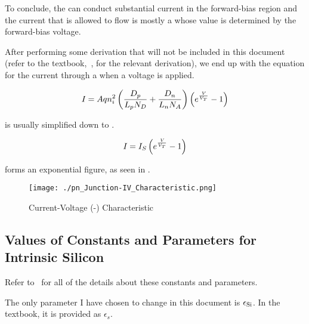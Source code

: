 \begin{blackbox}
  To conclude, the \PNJunction{} can conduct substantial current in the forward-bias region and the current that is allowed to flow is mostly a  whose value is determined by the forward-bias voltage.
\end{blackbox}

After performing some derivation that will not be included in this document (refer to the textbook,~\cite{sedraTextbook7}, for the relevant derivation), we end up with the equation for the current through a \PNJunction{} when a voltage is applied.

\begin{equation}\label{eq:pn-Junction-Current-Voltage_Relation}
  I_{} = A q n_{i}^{2} \left( \frac{D_{p}}{L_{p} N_{D}} + \frac{D_{n}}{L_{n} N_{A}} \right) \left( e^{\frac{V_{}}{V_{T}}} - 1 \right)
\end{equation}

 is usually simplified down to .

\begin{equation}\label{eq:pn-Junction-Current-Voltage_Relation-Simple}
  I_{} = I_{S} \left( e^{\frac{V_{}}{V_{T}}} - 1 \right)
\end{equation}

 forms an exponential figure, as seen in .

\begin{figure}[h!tbp]
  \centering
  \texttt{[image: ./pn\_Junction-IV\_Characteristic.png]}
  \caption{\PNJunction{} Current-Voltage (\DCCurrent{}-\DCVoltage{}) Characteristic \parencite[p.~160]{sedraTextbook7}}
  \label{fig:pn-Junction-Current-Voltage_Relation}
\end{figure}

\subsection{Values of Constants and Parameters for Intrinsic Silicon}\label{subsec:Constants_Parameters_Intrinsic_Silicon}
Refer to~\cite[Table~3.1]{sedraTextbook7} for all of the details about these constants and parameters.

The only parameter I have chosen to change in this document is $\epsilon_{\mathrm{Si}}$.
In the textbook, it is provided as $\epsilon_{s}$.

